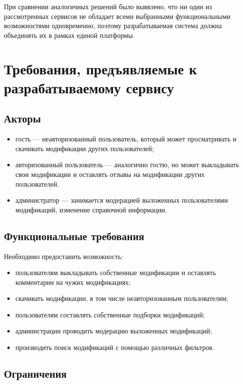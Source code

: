При сравнении аналогичных решений было выявлено, что ни один из рассмотренных сервисов не обладает всеми выбранными функциональными возможностями одновременно, поэтому разрабатываемая система должна объединять их в рамках единой платформы.

\section{Требования, предъявляемые к разрабатываемому сервису}

\subsection*{Акторы}

\begin{itemize}
	\item гость --- неавторизованный пользователь, который может просматривать и скачивать модификации других пользователей;
	\item авторизованный пользователь --- аналогично гостю, но может выкладывать свои модификации и оставлять отзывы на модификации других пользователей.
	\item администратор --- занимается модерацией выложенных пользователями модификаций, изменение справочной информации.
\end{itemize}

\subsection*{Функциональные требования}

Необходимо предоставить возможность:
\begin{itemize}
	\item пользователям выкладывать собственные модификации и оставлять комментарии на чужих модификациях;
	\item скачивать модификации, в том числе неавторизованным пользователям;
	\item пользователям составлять собственные подборки модификаций;
	\item администрации проводить модерацию выложенных модификаций;
	\item производить поиск модификаций с помощью различных фильтров.
	
\end{itemize}

\subsection*{Ограничения}

